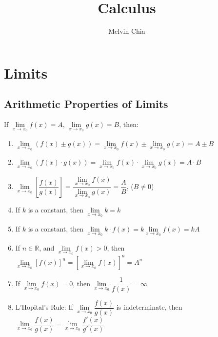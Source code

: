 \documentclass{report}
\title{Calculus}
\author{Melvin Chia}
\begin{document}
\maketitle
\tableofcontents

\chapter{Limits}

\section{Arithmetic Properties of Limits}

\begin{mdframed}[style=MyFrame]
      If $\lim\limits_{x \to x_0} f(x) = A$, $\lim\limits_{x \to x_0} g(x) = B$, then:
      \begin{enumerate}[label= (\alph*)]
            \item $\lim\limits_{x \to x_0} (f(x) \pm g(x)) = \lim\limits_{x \to x_0} f(x) \pm \lim\limits_{x \to x_0} g(x) = A \pm B$
            \item $\lim\limits_{x \to x_0} (f(x) \cdot g(x)) = \lim\limits_{x \to x_0} f(x) \cdot \lim\limits_{x \to x_0} g(x) = A \cdot B$
            \item $\lim\limits_{x \to x_0} \left[\dfrac{f(x)}{g(x)}\right] = \dfrac{\lim\limits_{x \to x_0} f(x)}{\lim\limits_{x \to x_0} g(x)} = \dfrac{A}{B}$, ($B \neq 0$)
            \item If $k$ is a constant, then $\lim\limits_{x \to x_0} k = k$
            \item If $k$ is a constant, then $\lim\limits_{x \to x_0} k \cdot f(x) = k
                        \lim\limits_{x \to x_0} f(x) = kA$
            \item If $n \in \mathbb{R}$, and $\lim\limits_{x \to x_0} f(x) > 0$, then
                  $\lim\limits_{x \to x_0} {[f(x)]}^n = {\left[\lim\limits_{x \to
                                    x_0}f(x)\right]}^n = A^n$
            \item If $\lim\limits_{x \to x_0} f(x) = 0$, then $\lim\limits_{x \to x_0}
                        \dfrac{1}{f(x)} = \infty$
            \item L'Hopital's Rule: If $\lim\limits_{x \to x_0} \dfrac{f(x)}{g(x)}$ is
                  indeterminate, then $\lim\limits_{x \to x_0} \dfrac{f(x)}{g(x)} =
                        \lim\limits_{x \to x_0} \dfrac{f'(x)}{g'(x)}$
      \end{enumerate}
\end{mdframed}
\end{document}
